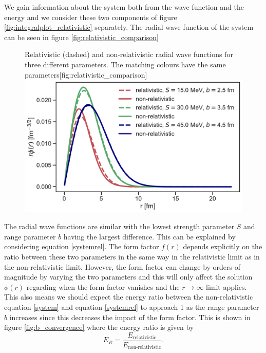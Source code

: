 We gain information about the system both from the wave function and the energy and we consider these two components of figure \ref{fig:integralplot_relativistic} separately. The radial wave function of the system can be seen in figure \ref{fig:relativistic_comparison}
\begin{figure}[H]
	\begin{sidecaption}{Relativistic (dashed) and non-relativistic radial wave functions for three different parameters. The matching colours have the same parameters}[fig:relativistic_comparison]
		\includegraphics[width=\linewidth]{Figures/rela_vs_nonrela_radial.pdf}
	\end{sidecaption}
\end{figure}
The radial wave functions are similar with the lowest strength parameter $S$ and range parameter $b$ having the largest difference. This can be explained by considering equation \eqref{systemrel}. The form factor $f(r)$ depends explicitly on the ratio between these two parameters in the same way in the relativistic limit as in the non-relativistic limit. However, the form factor can change by orders of magnitude by varying the two parameters and this will only affect the solution $\phi(r)$ regarding when the form factor vanishes and the $r\rightarrow \infty$ limit applies. This also means we should expect the energy ratio between the non-relativistic equation \eqref{system} and equation \eqref{systemrel} to approach 1 as the range parameter $b$ increases since this decreases the impact of the form factor. This is shown in figure \ref{fig:b_convergence} where the energy ratio is given by
\begin{equation} \label{energyratio}
	E_R = \frac{E_\text{relativistic}}{E_\text{non-relativistic}}.
\end{equation}
